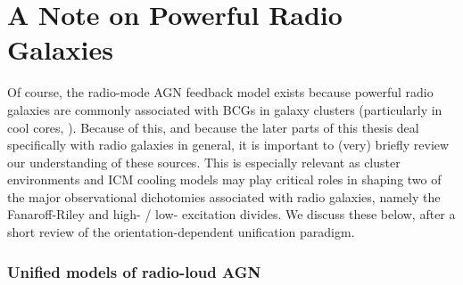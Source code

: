 \section{A Note on Powerful Radio Galaxies}

Of course, the radio-mode AGN feedback model exists because powerful radio galaxies 
are commonly associated with BCGs in galaxy clusters (particularly in cool cores, \citealt{burns90}). 
Because of this, and because the later parts of this thesis deal specifically with radio galaxies in general, 
it is important to (very) briefly review our understanding of these sources. This is especially relevant as 
cluster environments and ICM cooling models may play critical roles in shaping two of the major 
observational dichotomies associated with radio galaxies, namely the Fanaroff-Riley and high- / low- excitation divides. We discuss these below, after a short review of the 
orientation-dependent unification paradigm. 







\subsubsection{{\bf Unified models of radio-loud AGN}}





